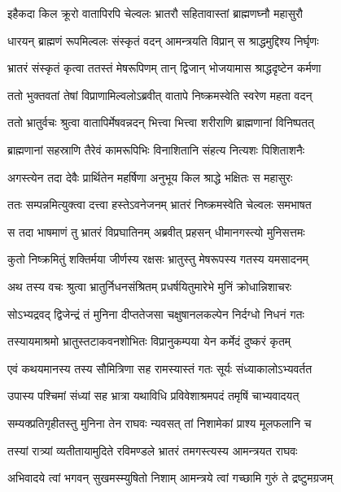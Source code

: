 \twolineshloka
{इहैकदा किल क्रूरो वातापिरपि चेल्वलः}
{भ्रातरौ सहितावास्तां ब्राह्मणघ्नौ महासुरौ} %

\twolineshloka
{धारयन् ब्राह्मणं रूपमिल्वलः संस्कृतं वदन्}
{आमन्त्रयति विप्रान् स श्राद्धमुद्दिश्य निर्घृणः} %

\twolineshloka
{भ्रातरं संस्कृतं कृत्वा ततस्तं मेषरूपिणम्}
{तान् द्विजान् भोजयामास श्राद्धदृष्टेन कर्मणा} %

\twolineshloka
{ततो भुक्तवतां तेषां विप्राणामिल्वलोऽब्रवीत्}
{वातापे निष्क्रमस्वेति स्वरेण महता वदन्} %

\twolineshloka
{ततो भ्रातुर्वचः श्रुत्वा वातापिर्मेषवन्नदन्}
{भित्त्वा भित्त्वा शरीराणि ब्राह्मणानां विनिष्पतत्} %

\twolineshloka
{ब्राह्मणानां सहस्राणि तैरेवं कामरूपिभिः}
{विनाशितानि संहत्य नित्यशः पिशिताशनैः} %

\twolineshloka
{अगस्त्येन तदा देवैः प्रार्थितेन महर्षिणा}
{अनुभूय किल श्राद्धे भक्षितः स महासुरः} %

\twolineshloka
{ततः सम्पन्नमित्युक्त्वा दत्त्वा हस्तेऽवनेजनम्}
{भ्रातरं निष्क्रमस्वेति चेल्वलः समभाषत} %

\twolineshloka
{स तदा भाषमाणं तु भ्रातरं विप्रघातिनम्}
{अब्रवीत् प्रहसन् धीमानगस्त्यो मुनिसत्तमः} %

\twolineshloka
{कुतो निष्क्रमितुं शक्तिर्मया जीर्णस्य रक्षसः}
{भ्रातुस्तु मेषरूपस्य गतस्य यमसादनम्} %

\twolineshloka
{अथ तस्य वचः श्रुत्वा भ्रातुर्निधनसंश्रितम्}
{प्रधर्षयितुमारेभे मुनिं क्रोधान्निशाचरः} %

\twolineshloka
{सोऽभ्यद्रवद् द्विजेन्द्रं तं मुनिना दीप्ततेजसा}
{चक्षुषानलकल्पेन निर्दग्धो निधनं गतः} %

\twolineshloka
{तस्यायमाश्रमो भ्रातुस्तटाकवनशोभितः}
{विप्रानुकम्पया येन कर्मेदं दुष्करं कृतम्} %

\twolineshloka
{एवं कथयमानस्य तस्य सौमित्रिणा सह}
{रामस्यास्तं गतः सूर्यः संध्याकालोऽभ्यवर्तत} %

\twolineshloka
{उपास्य पश्चिमां संध्यां सह भ्रात्रा यथाविधि}
{प्रविवेशाश्रमपदं तमृषिं चाभ्यवादयत्} %

\twolineshloka
{सम्यक्प्रतिगृहीतस्तु मुनिना तेन राघवः}
{न्यवसत् तां निशामेकां प्राश्य मूलफलानि च} %

\twolineshloka
{तस्यां रात्र्यां व्यतीतायामुदिते रविमण्डले}
{भ्रातरं तमगस्त्यस्य आमन्त्रयत राघवः} %

\twolineshloka
{अभिवादये त्वां भगवन् सुखमस्म्युषितो निशाम्}
{आमन्त्रये त्वां गच्छामि गुरुं ते द्रष्टुमग्रजम्} %

